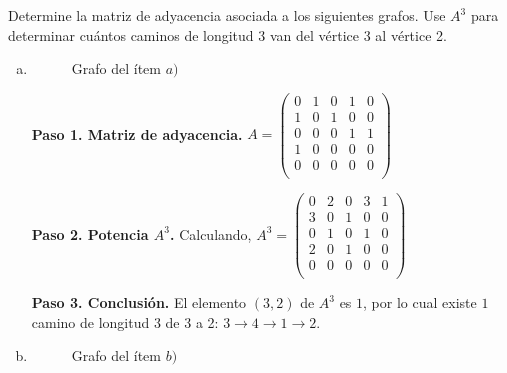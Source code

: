 \begin{prob} 
Determine la matriz de adyacencia asociada a los siguientes grafos. Use $A^3$ para determinar cuántos caminos de longitud 3 van del vértice 3 al vértice 2.

\begin{enumerate}[a)]
\item
\begin{figure}[!htbp]
\centering
{}
\caption{Grafo del ítem $a)$}
\label{fig:grafo_adyacencia_a}
\end{figure}

\begin{myproof}
\textbf{Paso 1. Matriz de adyacencia.} \(
A = \begin{pmatrix}
0 & 1 & 0 & 1 & 0 \\
1 & 0 & 1 & 0 & 0 \\
0 & 0 & 0 & 1 & 1 \\
1 & 0 & 0 & 0 & 0 \\
0 & 0 & 0 & 0 & 0 \\
\end{pmatrix}
\)

\textbf{Paso 2. Potencia $A^3$.} Calculando, \(
A^3 = \begin{pmatrix}
0 & 2 & 0 & 3 & 1 \\
3 & 0 & 1 & 0 & 0 \\
0 & 1 & 0 & 1 & 0 \\
2 & 0 & 1 & 0 & 0 \\
0 & 0 & 0 & 0 & 0 \\
\end{pmatrix}
\)

\textbf{Paso 3. Conclusión.} El elemento $(3,2)$ de $A^3$ es $1$, por lo cual existe $\boxed{1}$ camino de longitud 3 de 3 a 2: $3 \to 4 \to 1 \to 2$.
\end{myproof}

\item
\begin{figure}[!htbp]
\centering
{}
\caption{Grafo del ítem $b)$}
\label{fig:grafo_adyacencia_b}
\end{figure}


\end{enumerate}
\end{prob}
